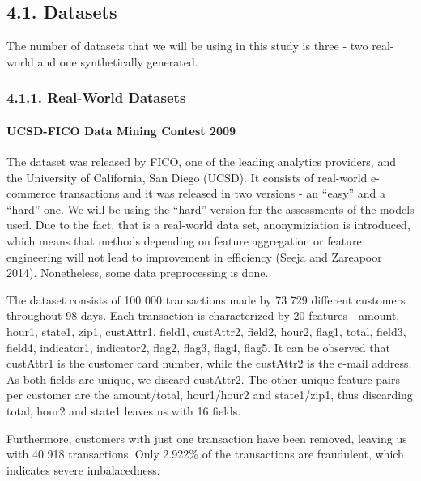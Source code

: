 \documentclass[12pt,]{article}
\let\oldparagraph\paragraph
\renewcommand{\paragraph}[1]{\oldparagraph{#1}\mbox{}}
\begin{document}
\hypertarget{datasets}{%
\subsection{4.1. Datasets}\label{datasets}}

The number of datasets that we will be using in this study is three -
two real-world and one synthetically generated.

\hypertarget{real-world-datasets}{%
\subsubsection{4.1.1. Real-World Datasets}\label{real-world-datasets}}

\hypertarget{ucsd-fico-data-mining-contest-2009}{%
\paragraph{UCSD-FICO Data Mining Contest
2009}\label{ucsd-fico-data-mining-contest-2009}}

The dataset was released by FICO, one of the leading analytics
providers, and the University of California, San Diego (UCSD). It
consists of real-world e-commerce transactions and it was released in
two versions - an ``easy'' and a ``hard'' one. We will be using the
``hard'' version for the assessments of the models used. Due to the
fact, that is a real-world data set, anonymiziation is introduced, which
means that methods depending on feature aggregation or feature
engineering will not lead to improvement in efficiency (Seeja and
Zareapoor 2014). Nonetheless, some data preprocessing is done.

The dataset consists of 100 000 transactions made by 73 729 different
customers throughout 98 days. Each transaction is characterized by 20
features - amount, hour1, state1, zip1, custAttr1, field1, custAttr2,
field2, hour2, flag1, total, field3, field4, indicator1, indicator2,
flag2, flag3, flag4, flag5. It can be observed that custAttr1 is the
customer card number, while the custAttr2 is the e-mail address. As both
fields are unique, we discard custAttr2. The other unique feature pairs
per customer are the amount/total, hour1/hour2 and state1/zip1, thus
discarding total, hour2 and state1 leaves us with 16 fields.

Furthermore, customers with just one transaction have been removed,
leaving us with 40 918 transactions. Only 2.922\% of the transactions
are fraudulent, which indicates severe imbalacedness.
\end{document}
